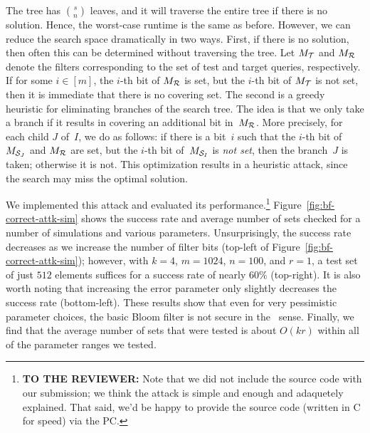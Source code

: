The tree has $\binom{s}{n}$ leaves, and it will traverse the entire tree if
there is no solution. Hence, the worst-case runtime is the same as before.
However, we can reduce the search space dramatically in two ways.
%
First, if there is no solution, then often this can be determined without
traversing the tree. Let $M_{\mathcal{T}}$ and $M_{\mathcal{R}}$ denote the filters
corresponding to the set of test and target queries, respectively.  If for some
$i \in [m]$, the $i$-th bit of $M_{\mathcal{R}}$ is set, but the $i$-th bit of $M_{\mathcal{T}}$
is not set, then it is immediate that there is no covering set.
%
The second is a greedy heuristic for eliminating branches of the search tree.
The idea is that we only take a branch if it results in covering an additional
bit in~$M_{\mathcal{R}}$. More precisely, for each child $J$ of~$I$, we do as follows:
if there is a bit~$i$ such that the $i$-th bit of $M_{\mathcal{S}_J}$ and $M_{\mathcal{R}}$
are set, but the $i$-th bit of~$M_{\mathcal{S}_I}$ is \emph{not set}, then the
branch~$J$ is taken; otherwise it is not.
%
This optimization results in a heuristic attack, since the search may miss the
optimal solution.

We implemented this attack and evaluated its performance.\footnote{\textbf{TO
THE REVIEWER:} Note that we did not include the source code with our submission;
we think the attack is simple and enough and adaquetely explained. That said,
we'd be happy to provide the source code (written in C for speed) via the PC.}
Figure~\ref{fig:bf-correct-attk-sim} shows the success rate and average number
of sets checked for a number of simulations and various parameters.
%
Unsurprisingly, the success rate decreases as we increase the number of filter
bits (top-left of Figure~\ref{fig:bf-correct-attk-sim}); however, with $k=4$,
$m=1024$, $n=100$, and $r=1$, a test set of just $512$ elements suffices for a
success rate of nearly $60\%$ (top-right). It is also worth noting that
increasing the error parameter only slightly decreases the success rate
(bottom-left). These results show that even for very pessimistic parameter
choices, the basic Bloom filter is not secure in the \ sense.
%
Finally, we find that the average number of sets that were tested is about
$O(kr)$ within all of the parameter ranges we tested.

